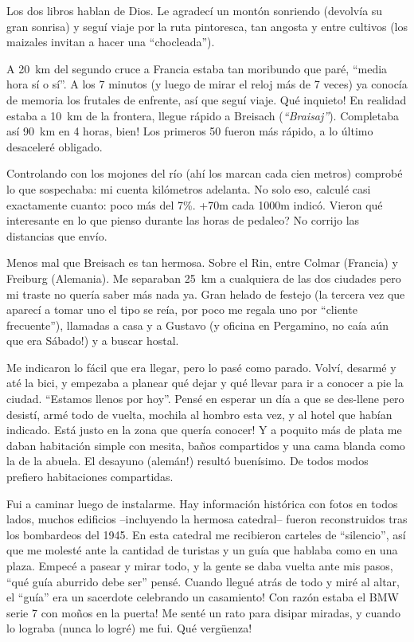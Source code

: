 Los dos libros hablan de Dios. Le agradec\'i un mont\'on sonriendo (devolv\'ia
su gran sonrisa) y segu\'i viaje por la ruta pintoresca, tan angosta y entre
cultivos (los maizales invitan a hacer una ``chocleada'').

A 20~km del segundo cruce a Francia estaba tan moribundo que par\'e, ``media
hora s\'i o s\'i''. A los 7 minutos (y luego de mirar el reloj m\'as de 7
veces) ya conoc\'ia de memoria los frutales de enfrente, as\'i que segu\'i
viaje. \textexclamdown Qu\'e inquieto! En realidad estaba a 10~km de la
frontera, llegue r\'apido a Breisach (\emph{``Braisaj''}). Completaba as\'i
90~km en 4 horas, \textexclamdown bien! Los primeros 50 fueron m\'as r\'apido,
a lo \'ultimo desaceler\'e obligado.

Controlando con los mojones del r\'io (ah\'i los marcan cada cien metros)
comprob\'e lo que sospechaba: mi cuenta kil\'ometros adelanta. No solo eso,
calcul\'e casi exactamente cuanto: poco m\'as del 7\%. {\small +}70m cada
1000m indic\'o. \textquestiondown Vieron qu\'e interesante en lo que pienso
durante las horas de pedaleo? No corrijo las distancias que env\'io.

Menos mal que Breisach es tan hermosa. Sobre el Rin, entre Colmar (Francia) y
Freiburg (Alemania). Me separaban 25~km a cualquiera de las dos ciudades pero
mi traste no quer\'ia saber m\'as nada ya. Gran helado de festejo (la tercera
vez que aparec\'i a tomar uno el tipo se re\'ia, por poco me regala uno por
``cliente frecuente''), llamadas a casa y a Gustavo (y oficina en Pergamino,
\textexclamdown no ca\'ia a\'un que era S\'abado!) y a buscar hostal.

Me indicaron lo f\'acil que era llegar, pero lo pas\'e como parado. Volv\'i,
desarm\'e y at\'e la bici, y empezaba a planear qu\'e dejar y qu\'e llevar
para ir a conocer a pie la ciudad. ``Estamos llenos por hoy''. Pens\'e en
esperar un d\'ia a que se des-llene pero desist\'i, arm\'e todo de vuelta,
mochila al hombro esta vez, y al hotel que hab\'ian indicado. \textexclamdown
Est\'a justo en la zona que quer\'ia conocer! Y a poquito m\'as de plata me
daban habitaci\'on simple con mesita, ba\~nos compartidos y una cama blanda
como la de la abuela. El desayuno (\textexclamdown alem\'an!) result\'o
buen\'isimo. De todos modos prefiero habitaciones compartidas.

Fui a caminar luego de instalarme. Hay informaci\'on hist\'orica con fotos en
todos lados, muchos edificios --incluyendo la hermosa catedral-- fueron
reconstruidos tras los bombardeos del 1945. En esta catedral me recibieron
carteles de ``silencio'', as\'i que me molest\'e ante la cantidad de turistas
y un gu\'ia que hablaba como en una plaza. Empec\'e a pasear y mirar todo, y
la gente se daba vuelta ante mis pasos, ``qu\'e gu\'ia aburrido debe ser''
pens\'e. \textexclamdown Cuando llegu\'e atr\'as de todo y mir\'e al altar, el
``gu\'ia'' era un sacerdote celebrando un casamiento! \textexclamdown Con
raz\'on estaba el {\small BMW} serie 7 con mo\~nos en la puerta! Me sent\'e un
rato para disipar miradas, y cuando lo lograba (nunca lo logr\'e) me fui.
\textexclamdown Qu\'e verg\"uenza!

